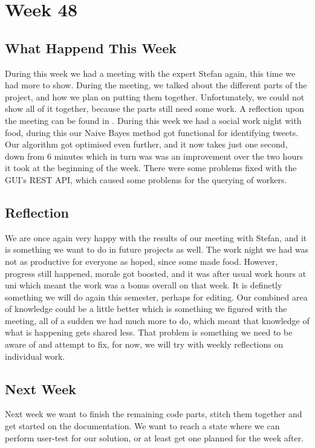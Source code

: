 \section*{Week 48} 
\subsection*{What Happend This Week}
During this week we had a meeting with the expert Stefan again, this time we had
more to show. During the meeting, we talked about the different parts of the
project, and how we plan on putting them together. Unfortunately, we could not
show all of it together, because the parts still need some work. A reflection
upon the meeting can be found in .
During this week we had a social work night with food, during this our Naive
Bayes method got functional for identifying tweets. Our algorithm got optimised
even further, and it now takes just one second, down from 6 minutes which in
turn was was an improvement over the two hours it took at the beginning of the
week.
There were some problems fixed with the \ac{GUI}'s \ac{REST} \ac{API}, which caused some problems for the querying of workers.

\subsection*{Reflection}
We are once again very happy with the results of our meeting with Stefan, and it
is something we want to do in future projects as well. The work night we had was
not as productive for everyone as hoped, since some made food. However, progress
still happened, morale got boosted, and it was after usual work hours at uni
which meant the work was a bonus overall on that week. It is definetly something
we will do again this semester, perhaps for editing. Our combined area of
knowledge could be a little better which is something we figured with the
meeting, all of a sudden we had much more to do, which meant that knowledge of
what is happening gets shared less. That problem is something we need to be
aware of and attempt to fix, for now, we will try with weekly reflections on
individual work.

\subsection*{Next Week}
Next week we want to finish the remaining code parts, stitch them together and
get started on the documentation. We want to reach a state where we can perform
user-test for our solution, or at least get one planned for the week after.


